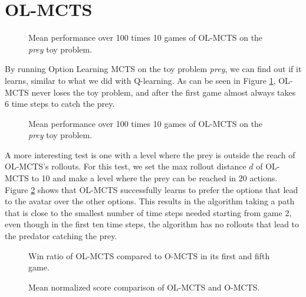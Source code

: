 \section{OL-MCTS}
\label{subsec:olmcts}

\begin{figure}
	\centering
	\caption{Mean performance over 100 times 10 games of OL-MCTS on the
	\textit{prey} toy problem.}
	\label{fig:olmctsPrey}
\end{figure}

By running Option Learning MCTS on the toy problem \textit{prey}, we can find
out if it learns, similar to what we did with Q-learning. As can be seen in
Figure \ref{fig:olmctsPrey}, OL-MCTS never loses the toy problem, and after the
first game almost always takes 6 time steps to catch the prey. 

\begin{figure}
	\centering
	\caption{Mean performance over 100 times 10 games of OL-MCTS on the
	\textit{prey} toy problem.}
	\label{fig:olmctsPrey3}
\end{figure}


A more
interesting test is one with a level where the prey is outside the reach of
OL-MCTS's rollouts. For this test, we set the max rollout distance $d$ of
OL-MCTS to 10 and make a level where the prey can be reached in 20 actions.
Figure \ref{fig:olmctsPrey3} shows that OL-MCTS successfully learns to prefer
the options that lead to the avatar over the other options. This results in the
algorithm taking a path that is close to the smallest number of time steps
needed starting from game 2, even though in the first ten time steps, the
algorithm has no rollouts that lead to the predator catching the prey.


\begin{figure}
	\centering
	\vspace{-.8cm}
	\caption{Win ratio of OL-MCTS compared to O-MCTS in its first and fifth game.}
	\label{fig:wins}
	\centering
	\vspace{-.8cm}
	\caption{Mean normalized score comparison of OL-MCTS and O-MCTS.}
	\label{fig:scores}
\end{figure}

